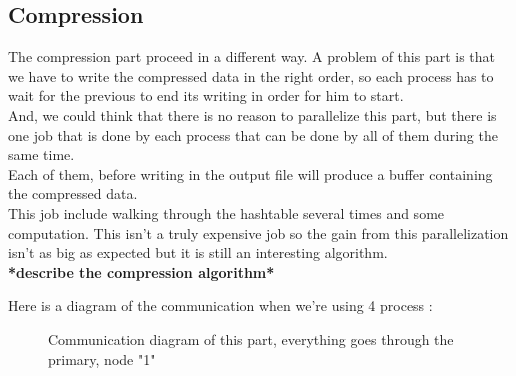 \subsection{Compression}
The compression part proceed in a different way. A problem of this part is that we have to write the compressed data in the right order, so each process has to wait for the previous to end its writing in order for him to start.\\
And, we could think that there is no reason to parallelize this part, but there is one job that is done by each process that can be done by all of them during the same time.\\
Each of them, before writing in the output file will produce a buffer containing the compressed data.\\
This job include walking through the hashtable several times and some computation. This isn't a truly expensive job so the gain from this parallelization isn't as big as expected but it is still an interesting algorithm.\\

\textbf{*describe the compression algorithm*}

Here is a diagram of the communication when we're using 4 process :
\begin{figure}[H]
\centering
{} 
\caption{Communication diagram of this part, everything goes through the primary, node "1"}
\label{fig:my_label}
\end{figure}

